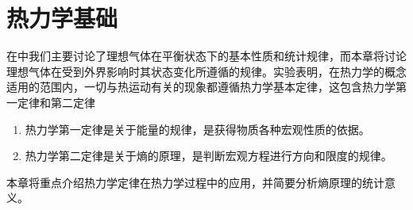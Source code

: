 \chapter{热力学基础}
\label{chap:热力学基础}
在中我们主要讨论了理想气体在平衡状态下的基本性质和统计规律，而本章将讨论理想气体在受到外界影响时其状态变化所遵循的规律。实验表明，在热力学的概念适用的范围内，一切与热运动有关的现象都遵循热力学基本定律，这包含热力学第一定律和第二定律
\begin{enumerate}
    \item 热力学第一定律是关于能量的规律，是获得物质各种宏观性质的依据。
    \item 热力学第二定律是关于熵的原理，是判断宏观方程进行方向和限度的规律。
\end{enumerate}
本章将重点介绍热力学定律在热力学过程中的应用，并简要分析熵原理的统计意义。





